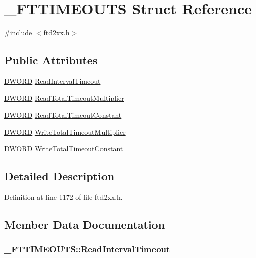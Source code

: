 \hypertarget{struct__FTTIMEOUTS}{
\section{\_\-FTTIMEOUTS Struct Reference}
\label{struct__FTTIMEOUTS}
}


{\ttfamily \#include $<$ftd2xx.h$>$}\subsection*{Public Attributes}
\begin{DoxyCompactItemize}
\item 
\hyperlink{LALUsbx64_2include_2WinTypes_8h_ad342ac907eb044443153a22f964bf0af}{DWORD} \hyperlink{struct__FTTIMEOUTS_a0f9592f9863a3230933833750b67d467}{ReadIntervalTimeout}
\item 
\hyperlink{LALUsbx64_2include_2WinTypes_8h_ad342ac907eb044443153a22f964bf0af}{DWORD} \hyperlink{struct__FTTIMEOUTS_abec01499b73ce0bd194ca0628dbf58e8}{ReadTotalTimeoutMultiplier}
\item 
\hyperlink{LALUsbx64_2include_2WinTypes_8h_ad342ac907eb044443153a22f964bf0af}{DWORD} \hyperlink{struct__FTTIMEOUTS_aa6478849c632565b01f91faca975cabe}{ReadTotalTimeoutConstant}
\item 
\hyperlink{LALUsbx64_2include_2WinTypes_8h_ad342ac907eb044443153a22f964bf0af}{DWORD} \hyperlink{struct__FTTIMEOUTS_a1944986d4b6760a45db8ce1b58fa3688}{WriteTotalTimeoutMultiplier}
\item 
\hyperlink{LALUsbx64_2include_2WinTypes_8h_ad342ac907eb044443153a22f964bf0af}{DWORD} \hyperlink{struct__FTTIMEOUTS_ac36dfafaf9522e0b041080242538d196}{WriteTotalTimeoutConstant}
\end{DoxyCompactItemize}


\subsection{Detailed Description}


Definition at line 1172 of file ftd2xx.h.

\subsection{Member Data Documentation}
\hypertarget{struct__FTTIMEOUTS_a0f9592f9863a3230933833750b67d467}{
\subsubsection[{ReadIntervalTimeout}]{ {\bf \_\-FTTIMEOUTS::ReadIntervalTimeout}}}
\label{struct__FTTIMEOUTS_a0f9592f9863a3230933833750b67d467}


